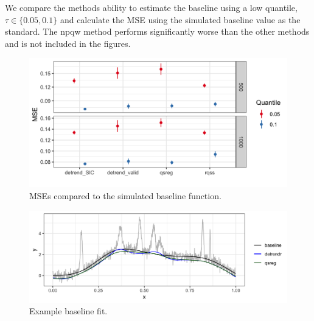 \documentclass[]{article}
\begin{document}
We compare the methods ability to estimate the baseline using a low quantile, $\tau \in \{0.05, 0.1\}$ and calculate the MSE using the simulated baseline value as the standard. The npqw method performs significantly worse than the other methods and is not included in the figures. 

\begin{figure}[h!]
	\caption{MSEs compared to the simulated baseline function.}
	\includegraphics[width = \linewidth]{Figures/peaks_mse.png}
\end{figure}

\begin{figure}[h!]
	\caption{Example baseline fit.}
	\includegraphics[width = \linewidth]{Figures/ex_baseline.png}
\end{figure}


\pagebreak




\end{document}

